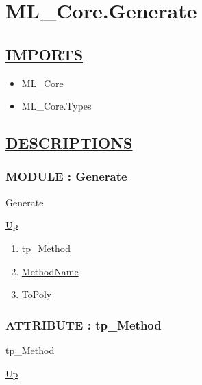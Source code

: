 \chapter*{ML\_Core.Generate}
\hypertarget{ecldoc:toc:ML_Core.Generate}{}

\section*{\underline{IMPORTS}}
\begin{itemize}
\item ML\_Core
\item ML\_Core.Types
\end{itemize}

\section*{\underline{DESCRIPTIONS}}
\subsection*{MODULE : Generate}
\hypertarget{ecldoc:ML_Core.Generate}{}
\begin{minipage}[t]{\textwidth}
\begin{flushleft}
 Generate 
\end{flushleft}
\end{minipage}
\hyperlink{ecldoc:toc:ML_Core}{Up}

\par
\par
\begin{enumerate}
\item \hyperlink{ecldoc:ecldoc-tp_Method}{tp\_Method}
\item \hyperlink{ecldoc:ml_core.generate.methodname}{MethodName}
\item \hyperlink{ecldoc:ml_core.generate.topoly}{ToPoly}
\end{enumerate}
\subsection*{ATTRIBUTE : tp\_Method}
\hypertarget{ecldoc:ecldoc-tp_Method}{}
\begin{minipage}[t]{\textwidth}
\begin{flushleft}
 tp\_Method 
\end{flushleft}
\end{minipage}
\hyperlink{ecldoc:ML_Core.Generate}{Up}

\par
\par

